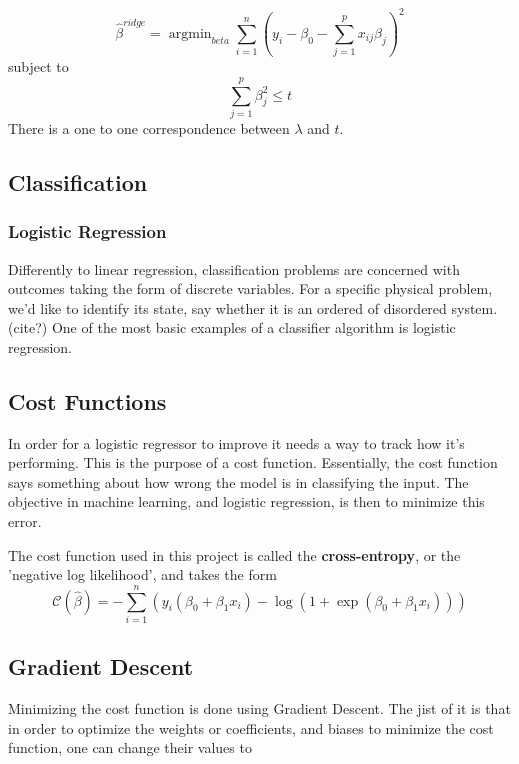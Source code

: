 \begin{equation}
	\hat{\beta}^{ridge} = \operatorname{argmin}_{beta}
							\sum\limits_{i=1}^n \left(y_i - \beta_0
							-\sum\limits_{j=1}^p x_{ij}\beta_j\right)^2
\end{equation}
subject to
\begin{equation}
	\sum\limits_{j=1}^p \beta_j^2 \leq t
\end{equation}
There is a one to one correspondence between \(\lambda\) and \(t\).
\cite{James2000}
\subsection{Classification}
\subsubsection{Logistic Regression}\label{seq:logistic}
Differently to linear regression, classification problems
are concerned with outcomes taking the form of discrete variables.
For a specific physical problem, we'd like to identify its state, say whether
it is an ordered of disordered system. (cite?) One of the most basic examples
of a classifier algorithm is logistic regression.

\subsection{Cost Functions}\label{seq:cost-functions}
In order for a logistic regressor to improve it needs a way to
track how it's performing. This is the purpose of a cost function. Essentially,
the cost function says something about how wrong the model is in classifying the
input. The objective in machine learning, and logistic regression, is then to minimize
this error.

The cost function used in this project is called the \textbf{cross-entropy}, or the
'negative log likelihood', and takes the form
\begin{equation}\label{eq:cross-entropy}
	\mathcal{C}(\hat{\beta})=-\sum_{i=1}^n  \left(y_i(\beta_0+\beta_1x_i) -\log{(1+\exp{(\beta_0+\beta_1x_i)})}\right)
\end{equation}

\subsection{Gradient Descent}\label{seq:gradient}
Minimizing the cost function is done using Gradient Descent.
The jist of it is that in order to optimize the weights or coefficients,
and biases to minimize the cost function, one can change their values to


